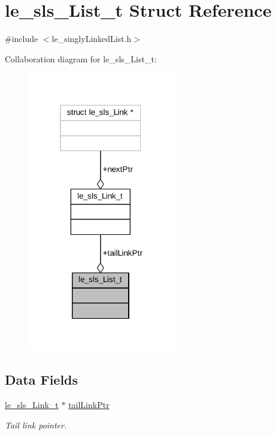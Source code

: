 \hypertarget{structle__sls___list__t}{}\section{le\+\_\+sls\+\_\+\+List\+\_\+t Struct Reference}
\label{structle__sls___list__t}


{\ttfamily \#include $<$le\+\_\+singly\+Linked\+List.\+h$>$}



Collaboration diagram for le\+\_\+sls\+\_\+\+List\+\_\+t\+:
\nopagebreak
\begin{figure}[H]
\begin{center}
\leavevmode
\includegraphics[width=183pt]{structle__sls___list__t__coll__graph}
\end{center}
\end{figure}
\subsection*{Data Fields}
\begin{DoxyCompactItemize}
\item 
\hyperlink{structle__sls___link__t}{le\+\_\+sls\+\_\+\+Link\+\_\+t} $\ast$ \hyperlink{structle__sls___list__t_a696f83142673b69689c6dcf750a09e4a}{tail\+Link\+Ptr}
\begin{DoxyCompactList}\small\item\em Tail link pointer. \end{DoxyCompactList}\end{DoxyCompactItemize}



